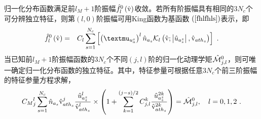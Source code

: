   \begin{theorem} \label{假设-分布函数弱独立特征假设}
      归一化分布函数满足前$l_M+1$阶振幅$\hat{f}_l^0 \left(\hat{\mathrm{v}} \right)$收敛。若所有阶振幅具有相同的$3N_c$个可分辨独立特征，则第$(l,0)$阶振幅可用King函数为基函数$\EQ{fhlfhls}$表示，即
      \begin{eqnarray}
          \fhl \left(\rmvh \right) &=& C_l \sum_{s=1}^{N_c}  \left [ \left (\muuas \right)^l \nhas \Kl \left(\rmvh;\left |\uhazs \right |,\vhaths \right) \right] ~.  \label{fhlfhlsM}
      \end{eqnarray}
      当已知前$l_M+1$阶振幅函数的$3N_c$个不同$(j,l)$阶的归一化动理学矩${\hat{\mathcal{M}}}{_{j,l}^0}$，则可唯一确定归一化分布函数的独立特征。其中，特征参量可根据任意$3N_c$个前三阶振幅的特征参量方程求解，
      \begin{eqnarray}
            {C_M}_j^l \sum_{s=1}^{N_c} \hat{n}_{a_s} \hat{\mathrm{v}}_{{ath}_s}^j \frac{ {\hat{u}}_{a_s^z}^l}{\hat{\mathrm{v}}_{{ath}_s}^l} 
            \times  \left (1 + \sum_{k=1}^{(j-s)/2} C_{j,l}^k \frac{{\hat{u}}_{a_s^z}^{2k}}{\hat{\mathrm{v}}_{{ath}_s}^{2k}} \right) = {\hat{\mathcal{M}}}{_{j,l}^0} , \quad l = 0,1,2 ~. \label{MhKjl0sM}
      \end{eqnarray}
  \end{theorem}

